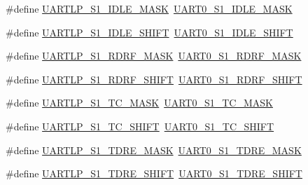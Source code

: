 \begin{DoxyCompactItemize}
\item 
\#define \hyperlink{group___backward___compatibility___symbols_ga96b6b702c4342c4af5004fb48b83efa7}{U\+A\+R\+T\+L\+P\+\_\+\+S1\+\_\+\+I\+D\+L\+E\+\_\+\+M\+A\+SK}~\hyperlink{group___u_a_r_t0___register___masks_gab6f26cdc2089161970bbd6d77daf345b}{U\+A\+R\+T0\+\_\+\+S1\+\_\+\+I\+D\+L\+E\+\_\+\+M\+A\+SK}
\item 
\#define \hyperlink{group___backward___compatibility___symbols_gae842244614239cddb394428e2e1f8bc0}{U\+A\+R\+T\+L\+P\+\_\+\+S1\+\_\+\+I\+D\+L\+E\+\_\+\+S\+H\+I\+FT}~\hyperlink{group___u_a_r_t0___register___masks_gac68bfcf79c38331eb53678c7578e5937}{U\+A\+R\+T0\+\_\+\+S1\+\_\+\+I\+D\+L\+E\+\_\+\+S\+H\+I\+FT}
\item 
\#define \hyperlink{group___backward___compatibility___symbols_gac731a20d480bddb1610a7a740e71ebc9}{U\+A\+R\+T\+L\+P\+\_\+\+S1\+\_\+\+R\+D\+R\+F\+\_\+\+M\+A\+SK}~\hyperlink{group___u_a_r_t0___register___masks_gabfc8c446e35e26275bc966d2a9c50115}{U\+A\+R\+T0\+\_\+\+S1\+\_\+\+R\+D\+R\+F\+\_\+\+M\+A\+SK}
\item 
\#define \hyperlink{group___backward___compatibility___symbols_ga431c49f191f29ccbeade2bd87502531c}{U\+A\+R\+T\+L\+P\+\_\+\+S1\+\_\+\+R\+D\+R\+F\+\_\+\+S\+H\+I\+FT}~\hyperlink{group___u_a_r_t0___register___masks_ga64f8830cd7e5c3c69d91f4747137f323}{U\+A\+R\+T0\+\_\+\+S1\+\_\+\+R\+D\+R\+F\+\_\+\+S\+H\+I\+FT}
\item 
\#define \hyperlink{group___backward___compatibility___symbols_ga1110069e543f57629a601fabe094b80f}{U\+A\+R\+T\+L\+P\+\_\+\+S1\+\_\+\+T\+C\+\_\+\+M\+A\+SK}~\hyperlink{group___u_a_r_t0___register___masks_ga0d63e21fc62457b6a441c82d0ed21980}{U\+A\+R\+T0\+\_\+\+S1\+\_\+\+T\+C\+\_\+\+M\+A\+SK}
\item 
\#define \hyperlink{group___backward___compatibility___symbols_ga61cc5706017331c9f55a89a10c291602}{U\+A\+R\+T\+L\+P\+\_\+\+S1\+\_\+\+T\+C\+\_\+\+S\+H\+I\+FT}~\hyperlink{group___u_a_r_t0___register___masks_ga00448db2843a19047ebd7ae86f2cb1fd}{U\+A\+R\+T0\+\_\+\+S1\+\_\+\+T\+C\+\_\+\+S\+H\+I\+FT}
\item 
\#define \hyperlink{group___backward___compatibility___symbols_ga8f434cacc5911ca08ef1e5d0275da950}{U\+A\+R\+T\+L\+P\+\_\+\+S1\+\_\+\+T\+D\+R\+E\+\_\+\+M\+A\+SK}~\hyperlink{group___u_a_r_t0___register___masks_ga54aac82fa657a6a49064908004abc80d}{U\+A\+R\+T0\+\_\+\+S1\+\_\+\+T\+D\+R\+E\+\_\+\+M\+A\+SK}
\item 
\#define \hyperlink{group___backward___compatibility___symbols_gad1469491e7fcddf3521ef7d5ac86dc04}{U\+A\+R\+T\+L\+P\+\_\+\+S1\+\_\+\+T\+D\+R\+E\+\_\+\+S\+H\+I\+FT}~\hyperlink{group___u_a_r_t0___register___masks_gaf1ba1833eeb3d207610024627260a23a}{U\+A\+R\+T0\+\_\+\+S1\+\_\+\+T\+D\+R\+E\+\_\+\+S\+H\+I\+FT}

\end{DoxyCompactItemize}
